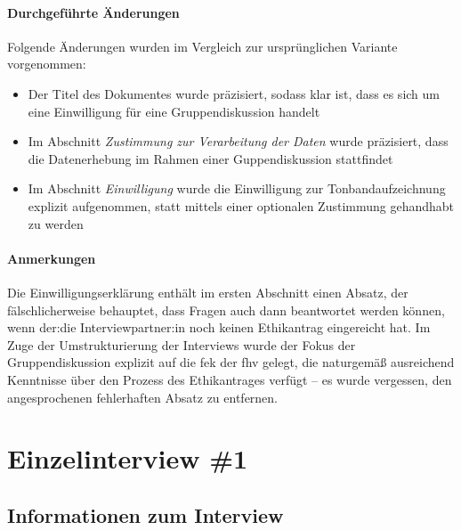 \documentclass[a4paper,12pt,twoside]{scrreprt}
\begin{document}
\subsubsection*{Durchgeführte Änderungen}
\label{appendix:änderungen-informed-consent-gruppendiskussion}

Folgende Änderungen wurden im Vergleich zur ursprünglichen Variante vorgenommen:
\begin{itemize}
    \item Der Titel des Dokumentes wurde präzisiert, sodass klar ist, dass es sich um eine Einwilligung für eine Gruppendiskussion handelt
    \item Im Abschnitt \textit{Zustimmung zur Verarbeitung der Daten} wurde präzisiert, dass die Datenerhebung im Rahmen einer Guppendiskussion stattfindet
    \item Im Abschnitt \textit{Einwilligung} wurde die Einwilligung zur Tonbandaufzeichnung explizit aufgenommen, statt mittels einer optionalen Zustimmung gehandhabt zu werden
\end{itemize}

\subsubsection*{Anmerkungen}
\label{appendix:anmerkungen-informed-consent-gruppendiskussion}

Die Einwilligungserklärung enthält im ersten Abschnitt einen Absatz, der fälschlicherweise behauptet, dass Fragen auch dann beantwortet werden können, wenn der:die Interviewpartner:in noch keinen Ethikantrag eingereicht hat. Im Zuge der Umstrukturierung der Interviews wurde der Fokus der Gruppendiskussion explizit auf die \acl{fek} der \acl{fhv} gelegt, die naturgemäß ausreichend Kenntnisse über den Prozess des Ethikantrages verfügt -- es wurde vergessen, den angesprochenen fehlerhaften Absatz zu entfernen.



\chapter{Einzelinterview \#1}
\label{appendix:interview-1}

\section{Informationen zum Interview}
\label{appendix:interview-1-infos}
\end{document}
